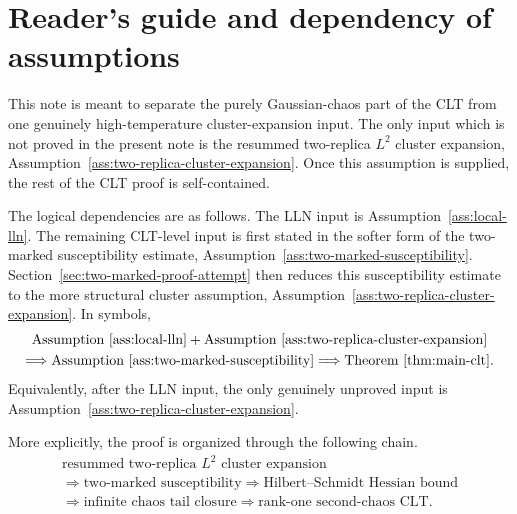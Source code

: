 \documentclass[11pt]{article}
\begin{document}
\section*{Reader's guide and dependency of assumptions}

This note is meant to separate the purely Gaussian-chaos part of the CLT from
one genuinely high-temperature cluster-expansion input.  The only input which is
not proved in the present note is the resummed two-replica $L^2$ cluster
expansion, Assumption~\ref{ass:two-replica-cluster-expansion}.  Once this
assumption is supplied, the rest of the CLT proof is self-contained.

The logical dependencies are as follows.  The LLN input is
Assumption~\ref{ass:local-lln}.  The remaining CLT-level input is first stated in
the softer form of the two-marked susceptibility estimate,
Assumption~\ref{ass:two-marked-susceptibility}.  Section~\ref{sec:two-marked-proof-attempt}
then reduces this susceptibility estimate to the more structural cluster
assumption, Assumption~\ref{ass:two-replica-cluster-expansion}.  In symbols,
\begin{equation}\label{eq:reader-main-dependency}
  \begin{gathered}
    \text{Assumption~\ref{ass:local-lln}}
    +
    \text{Assumption~\ref{ass:two-replica-cluster-expansion}}
    \\
    \Longrightarrow
    \text{Assumption~\ref{ass:two-marked-susceptibility}}
    \Longrightarrow
    \text{Theorem~\ref{thm:main-clt}}.
  \end{gathered}
\end{equation}
Equivalently, after the LLN input, the only genuinely unproved input is
Assumption~\ref{ass:two-replica-cluster-expansion}.

More explicitly, the proof is organized through the following chain.
\begin{equation}\label{eq:reader-chain}
  \begin{gathered}
    \text{resummed two-replica }L^2\text{ cluster expansion}
    \\
    \Longrightarrow
    \text{two-marked susceptibility}
    \Longrightarrow
    \text{Hilbert--Schmidt Hessian bound}
    \\
    \Longrightarrow
    \text{infinite chaos tail closure}
    \Longrightarrow
    \text{rank-one second-chaos CLT}.
  \end{gathered}
\end{equation}
\end{document}
